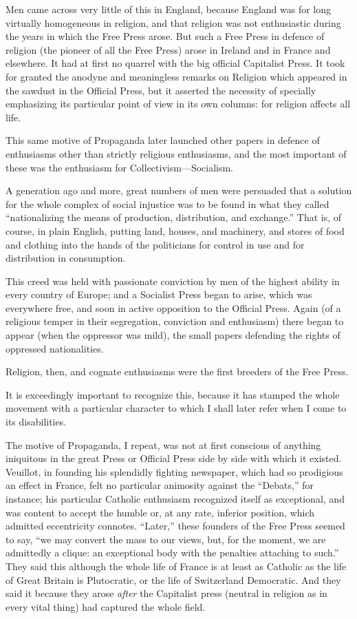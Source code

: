 \documentclass{book}
\begin{document}
Men came across very little of this in England, because England was for long virtually homogeneous in religion, and that religion was not enthusiastic during the years in which the Free Press arose. But such a Free Press in defence of religion (the pioneer of all the Free Press) arose in Ireland and in France and elsewhere. It had at first no quarrel with the big official Capitalist Press. It took for granted the anodyne and meaningless remarks on Religion which appeared in the sawdust in the Official Press, but it asserted the necessity of specially emphasizing its particular point of view in its own columns: for religion affects all life.

This same motive of Propaganda later launched other papers in defence of enthusiasms other than strictly religious enthusiasms, and the most important of these was the enthusiasm for Collectivism—Socialism.

A generation ago and more, great numbers of men were persuaded that a solution for the whole complex of social injustice was to be found in what they called “nationalizing the means of production, distribution, and exchange.” That is, of course, in plain English, putting land, houses, and machinery, and stores of food and clothing into the hands of the politicians for control in use and for distribution in consumption.

This creed was held with passionate conviction by men of the highest ability in every country of Europe; and a Socialist Press began to arise, which was everywhere free, and soon in active opposition to the Official Press. Again (of a religious temper in their segregation, conviction and enthusiasm) there began to appear (when the oppressor was mild), the small papers defending the rights of oppressed nationalities.

Religion, then, and cognate enthusiasms were the first breeders of the Free Press.

It is exceedingly important to recognize this, because it has stamped the whole movement with a particular character to which I shall later refer when I come to its disabilities.

The motive of Propaganda, I repeat, was not at first conscious of anything iniquitous in the great Press or Official Press side by side with which it existed. Veuillot, in founding his splendidly fighting newspaper, which had so prodigious an effect in France, felt no particular animosity against the “Debats,” for instance; his particular Catholic enthusiasm recognized itself as exceptional, and was content to accept the humble or, at any rate, inferior position, which admitted eccentricity connotes. “Later,” these founders of the Free Press seemed to say, “we may convert the mass to our views, but, for the moment, we are admittedly a clique: an exceptional body with the penalties attaching to such.” They said this although the whole life of France is at least as Catholic as the life of Great Britain is Plutocratic, or the life of Switzerland Democratic. And they said it because they arose \emph{after} the Capitalist press (neutral in religion as in every vital thing) had captured the whole field.
\end{document}

